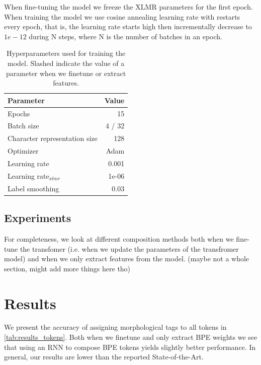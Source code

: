 \documentclass[11pt]{article}
\begin{document}
    	When fine-tuning the model we freeze the XLMR parameters for
     the first epoch.  When training the model we use cosine annealing
     learning rate with restarts every epoch, that is, the learning
     rate starts high then incrementally decrease to $1e-12$ during N
     steps, where N is the number of batches in an epoch.
	
	\begin{table}[h]
		\centering
		\begin{tabular}{lr}
			Parameter & Value \\
			\hline
			Epochs & 15 \\
			Batch size & 4 / 32 \\
			Character representation size & 128 \\
			Optimizer & Adam \\
			Learning rate & 0.001 \\
			Learning rate$_{xlmr}$ & 1e-06 \\
			Label smoothing & 0.03 \\
			
		\end{tabular}
		\caption{\label{tab:parameters} Hyperparameters used for training the model. Slashed indicate the value of a parameter when we finetune or extract features.}
	\end{table}

    \subsection{Experiments}

        For completeness, we look at different composition methods
     both when we fine-tune the transfomer (i.e. when we update the
     parameters of the transfromer model) and when we only extract
     features from the model. (maybe not a whole section, might add more things here tho)

	
	\section{Results}
	\label{results}
	
	
	
	We present the accuracy of assigning morphological tags to all tokens in \cref{tab:results_tokens}. Both when we finetune and only extract BPE weights we see that using an RNN to compose BPE tokens yields slightly better performance.
	In general, our results are lower than the reported State-of-the-Art.
	
\end{document}
